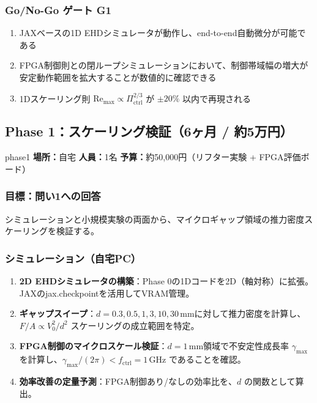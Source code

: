 \documentclass[12pt,a4paper]{ltjsarticle}
\begin{document}
\subsubsection{Go/No-Go ゲート G1}

\begin{successbox}[G1通過条件]
\begin{enumerate}[leftmargin=2em]
  \item JAXベースの1D EHDシミュレータが動作し、end-to-end自動微分が可能である
  \item FPGA制御則との閉ループシミュレーションにおいて、制御帯域幅の増大が安定動作範囲を拡大することが数値的に確認できる
  \item 1Dスケーリング則 $\mathrm{Re}_{\max} \propto \Pi_{\mathrm{ctrl}}^{2/3}$ が $\pm 20\%$ 以内で再現される
\end{enumerate}
\end{successbox}

\newpage
\subsection{Phase 1：スケーリング検証（6ヶ月 / 約5万円）}

\begin{phasebox}{phase1}
\textbf{場所：}自宅 \quad
\textbf{人員：}1名 \quad
\textbf{予算：}約50,000円（リフター実験 + FPGA評価ボード）
\end{phasebox}

\subsubsection{目標：問い1への回答}

シミュレーションと小規模実験の両面から、マイクロギャップ領域の推力密度スケーリングを検証する。

\subsubsection{シミュレーション（自宅PC）}

\begin{enumerate}[leftmargin=2em]
  \item \textbf{2D EHDシミュレータの構築}：Phase 0の1Dコードを2D（軸対称）に拡張。JAXのjax.checkpointを活用してVRAM管理。
  \item \textbf{ギャップスイープ}：$d = 0.3, 0.5, 1, 3, 10, 30$\,mmに対して推力密度を計算し、$F/A \propto V_0^2/d^2$ スケーリングの成立範囲を特定。
  \item \textbf{FPGA制御のマイクロスケール検証}：$d = 1$\,mm領域で不安定性成長率 $\gamma_{\max}$ を計算し、$\gamma_{\max}/(2\pi) < f_{\mathrm{ctrl}} = 1$\,GHz であることを確認。
  \item \textbf{効率改善の定量予測}：FPGA制御あり/なしの効率比を、$d$ の関数として算出。
\end{enumerate}
\end{document}

